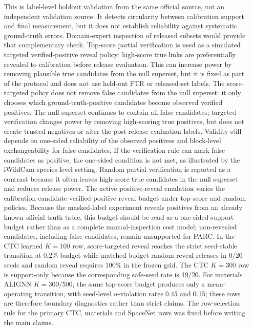 \documentclass[10pt,twocolumn]{article}
\begin{document}
This is label-level holdout validation from the same official source, not an independent validation source.
It detects circularity between calibration support and final measurement, but it does not establish reliability against systematic ground-truth errors.
Domain-expert inspection of released subsets would provide that complementary check.
Top-score partial verification is used as a simulated targeted verified-positive reveal policy: high-score true links are preferentially revealed to calibration before release evaluation.
This can increase power by removing plausible true candidates from the null superset, but it is fixed as part of the protocol and does not use held-out FTR or released-set labels.
The score-targeted policy does not remove false candidates from the null superset: it only chooses which ground-truth-positive candidates become observed verified positives.
The null superset continues to contain all false candidates; targeted verification changes power by removing high-scoring true positives, but does not create trusted negatives or alter the post-release evaluation labels.
Validity still depends on one-sided reliability of the observed positives and block-level exchangeability for false candidates.
If the verification rule can mark false candidates as positive, the one-sided condition is not met, as illustrated by the iWildCam species-level setting.
Random partial verification is reported as a contrast because it often leaves high-score true candidates in the null superset and reduces release power.
The active positive-reveal emulation varies the calibration-candidate verified-positive reveal budget under top-score and random policies.
Because the masked-label experiment reveals positives from an already known official truth table, this budget should be read as a one-sided-support budget rather than as a complete manual-inspection cost model; non-revealed candidates, including false candidates, remain unsupported for PARC.
In the CTC learned \(K=100\) row, score-targeted reveal reaches the strict seed-stable transition at 0.2\% budget while matched-budget random reveal releases in 0/20 seeds and random reveal requires 100\% in the frozen grid.
The CTC \(K=300\) row is support-only because the corresponding safe-seed rate is 19/20.
For materials ALIGNN \(K=300/500\), the same top-score budget produces only a mean-operating transition, with seed-level \(\alpha\)-violation rates 0.45 and 0.15; these rows are therefore boundary diagnostics rather than strict claims.
The row-selection rule for the primary CTC, materials and SpaceNet rows was fixed before writing the main claims.
\end{document}
